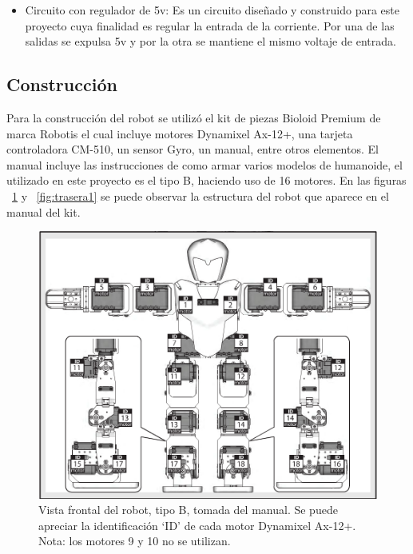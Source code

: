 \begin{itemize}
\item Circuito con regulador de 5v: Es un circuito diseñado y construido para este proyecto cuya finalidad es regular la entrada de la corriente. Por una de las salidas se expulsa 5v y por la otra se mantiene el mismo voltaje de entrada. 
\end{itemize}


\label{subsection:construccion}
\subsection{Construcción}
Para la construcción del robot se utilizó el kit de piezas Bioloid Premium de marca Robotis el cual incluye motores Dynamixel Ax-12+, una tarjeta controladora CM-510, un sensor Gyro, un manual, entre otros elementos. El manual incluye las instrucciones de como armar varios modelos de humanoide, el utilizado en este proyecto es el tipo B, haciendo uso de 16 motores. En las figuras ~\ref{fig:frontal} y ~\ref{fig:trasera1} se puede observar la estructura del robot que aparece en el manual del kit. 

\begin{figure}[hbtp]
\centering
\includegraphics[scale=0.3]{imagenes/Robot.png}
\caption{Vista frontal del robot, tipo B, tomada del manual. Se puede apreciar la identificación ‘ID’ de cada motor Dynamixel Ax-12+. Nota: los motores 9 y 10 no se utilizan.}
\label{fig:frontal}
\end{figure}

